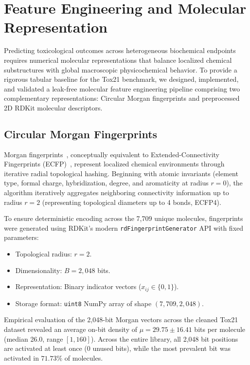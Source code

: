 \section{Feature Engineering and Molecular Representation}
\label{sec:features}

Predicting toxicological outcomes across heterogeneous biochemical endpoints requires numerical molecular representations that balance localized chemical substructures with global macroscopic physicochemical behavior. To provide a rigorous tabular baseline for the Tox21 benchmark, we designed, implemented, and validated a leak-free molecular feature engineering pipeline comprising two complementary representations: Circular Morgan fingerprints and preprocessed 2D RDKit molecular descriptors.

\subsection{Circular Morgan Fingerprints}
\label{subsec:morgan}
Morgan fingerprints~\cite{morgan1965generation}, conceptually equivalent to Extended-Connectivity Fingerprints (ECFP)~\cite{rogers2010extended}, represent localized chemical environments through iterative radial topological hashing. Beginning with atomic invariants (element type, formal charge, hybridization, degree, and aromaticity at radius $r = 0$), the algorithm iteratively aggregates neighboring connectivity information up to radius $r = 2$ (representing topological diameters up to 4 bonds, ECFP4).

To ensure deterministic encoding across the 7,709 unique molecules, fingerprints were generated using RDKit's modern \texttt{rdFingerprintGenerator} API with fixed parameters:
\begin{itemize}
    \item Topological radius: $r = 2$.
    \item Dimensionality: $B = 2{,}048$ bits.
    \item Representation: Binary indicator vectors ($x_{ij} \in \{0, 1\}$).
    \item Storage format: \texttt{uint8} NumPy array of shape $(7{,}709, 2{,}048)$.
\end{itemize}

Empirical evaluation of the 2,048-bit Morgan vectors across the cleaned Tox21 dataset revealed an average on-bit density of $\mu = 29.75 \pm 16.41$ bits per molecule (median 26.0, range $[1, 160]$). Across the entire library, all 2,048 bit positions are activated at least once (0 unused bits), while the most prevalent bit was activated in $71.73\%$ of molecules.

